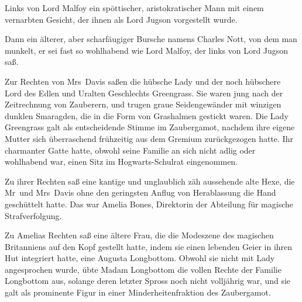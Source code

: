 Links von Lord Malfoy ein spöttischer, aristokratischer Mann mit einem vernarbten Gesicht, der ihnen als Lord Jugson vorgestellt wurde.

Dann ein älterer, aber scharfäugiger Bursche namens Charles Nott, von dem man munkelt, er sei fast so wohlhabend wie Lord Malfoy, der links von Lord Jugson saß.

Zur Rechten von Mrs~Davis saßen die hübsche Lady und der noch hübschere Lord des Edlen und Uralten Geschlechts Greengrass. Sie waren jung nach der Zeitrechnung von Zauberern, und trugen graue Seidengewänder mit winzigen dunklen Smaragden, die in die Form von Grashalmen gestickt waren. Die Lady Greengrass galt als entscheidende Stimme im Zaubergamot, nachdem ihre eigene Mutter sich überraschend frühzeitig aus dem Gremium zurückgezogen hatte. Ihr charmanter Gatte hatte, obwohl seine Familie an sich nicht adlig oder wohlhabend war, einen Sitz im Hogwarts-Schulrat eingenommen.

Zu ihrer Rechten saß eine kantige und unglaublich zäh aussehende alte Hexe, die Mr~und Mrs~Davis ohne den geringsten Anflug von Herablassung die Hand geschüttelt hatte. Das war Amelia Bones, Direktorin der Abteilung für magische Strafverfolgung.

Zu Amelias Rechten saß eine ältere Frau, die die Modeszene des magischen Britanniens auf den Kopf gestellt hatte, indem sie einen lebenden Geier in ihren Hut integriert hatte, eine Augusta Longbottom. Obwohl sie nicht mit Lady angesprochen wurde, übte Madam Longbottom die vollen Rechte der Familie Longbottom aus, solange deren letzter Spross noch nicht volljährig war, und sie galt als prominente Figur in einer Minderheitenfraktion des Zaubergamot.

